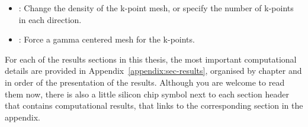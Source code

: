 \begin{refsection}
\begin{itemize}
\item {}: Change the density of the k-point mesh, 
or specify the number of k-points in each direction. 
 
\item {}: Force a gamma centered mesh for the k-points. 
 
\end{itemize} 
 
For each of the results sections in this thesis, the most important 
computational details are provided in Appendix~\ref{appendix:sec-results}, 
organised by chapter and in order of the presentation of the results. Although 
you are welcome to read them now, there is also a little silicon chip symbol 
next to each section header that contains computational results, that links to 
the corresponding section in the appendix.  
 
\printbibliography 
\end{refsection} 
 
